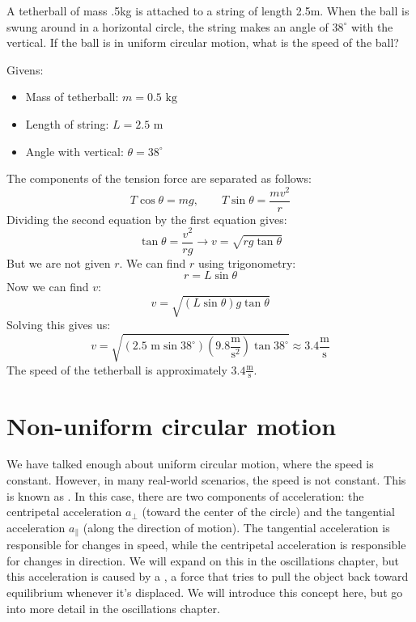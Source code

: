 \begin{Exercise}[label={ex:tetherball}, title={Playground Tetherball}]

  A tetherball of mass .5kg is attached to a string of length 2.5m. When the ball is swung around in a horizontal circle, the string makes an angle of $38^\circ$ with the vertical. If the ball is in uniform circular motion, what is the speed of the ball?
\end{Exercise}
\begin{Answer}[ref={ex:tetherball}]
  Givens:
  \begin{itemize}
    \item Mass of tetherball: $m = 0.5 \text{ kg}$
    \item Length of string: $L = 2.5 \text{ m}$
    \item Angle with vertical: $\theta = 38^\circ$
  \end{itemize}

  The components of the tension force are separated as follows:
  \[
    T\cos\theta = mg,\qquad T\sin\theta = \frac{mv^2}{r}
  \]
  Dividing the second equation by the first equation gives:
  \[
    \tan\theta = \frac{v^2}{rg} \to v = \sqrt{rg\tan\theta}
  \]
  But we are not given $r$. We can find $r$ using trigonometry:
  \[
    r = L\sin\theta
  \]
  Now we can find $v$:
  \[
    v = \sqrt{(L\sin\theta)g\tan\theta}
  \]
  Solving this gives us:
  \[
    v = \sqrt{(2.5\text{ m}\sin 38^\circ)(9.8 \frac{\text{m}}{\text{s}^2})\tan 38^\circ} \approx 3.4 \frac{\text{m}}{\text{s}}
  \]
  The speed of the tetherball is approximately $3.4 \frac{\text{m}}{\text{s}}$.
\end{Answer}

\section{Non-uniform circular motion}
We have talked enough about uniform circular motion, where the speed is constant. However, in many real-world scenarios, the speed is not constant. This is known as . In this case, there are two components of acceleration: the centripetal acceleration $a_\perp$ (toward the center of the circle) and the tangential acceleration $a_\parallel$ (along the direction of motion). The tangential acceleration is responsible for changes in speed, while the centripetal acceleration is responsible for changes in direction. We will expand on this in the oscillations chapter, but this acceleration is caused by a , a force that tries to pull the object back toward equilibrium whenever it's displaced. We will introduce this concept here, but go into more detail in the oscillations chapter.

